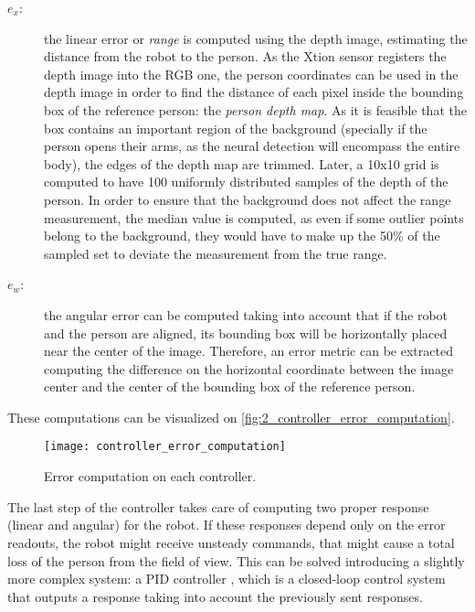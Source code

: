 \begin{description}
	\item[$e_x$:] the linear error or \textit{range} is computed using the depth image, estimating the distance from the robot to the person. As the Xtion sensor registers the depth image into the RGB one, the person coordinates can be used in the depth image in order to find the distance of each pixel inside the bounding box of the reference person: the \textit{person depth map}. As it is feasible that the box contains an important region of the background (specially if the person opens their arms, as the neural detection will encompass the entire body), the edges of the depth map are trimmed. Later, a 10x10 grid is computed to have 100 uniformly distributed samples of the depth of the person. In order to ensure that the background does not affect the range measurement, the median value is computed, as even if some outlier points belong to the background, they would have to make up the 50\% of the sampled set to deviate the measurement from the true range.
	
	\item[$e_w$:] the angular error can be computed taking into account that if the robot and the person are aligned, its bounding box will be horizontally placed near the center of the image. Therefore, an error metric can be extracted computing the difference on the horizontal coordinate between the image center and the center of the bounding box of the reference person.
\end{description}

These computations can be visualized on \autoref{fig:2_controller_error_computation}.


\begin{figure}[h]
	\centering
	\texttt{[image: controller\_error\_computation]}
	\caption{Error computation on each controller.}
	\label{fig:2_controller_error_computation}
\end{figure}

The last step of the controller takes care of computing two proper response (linear and angular) for the robot. If these responses depend only on the error readouts, the robot might receive unsteady commands, that might cause a total loss of the person from the field of view. This can be solved introducing a slightly more complex system: a PID controller \cite{pid_controllers}, which is a closed-loop control system that outputs a response taking into account the previously sent responses.



